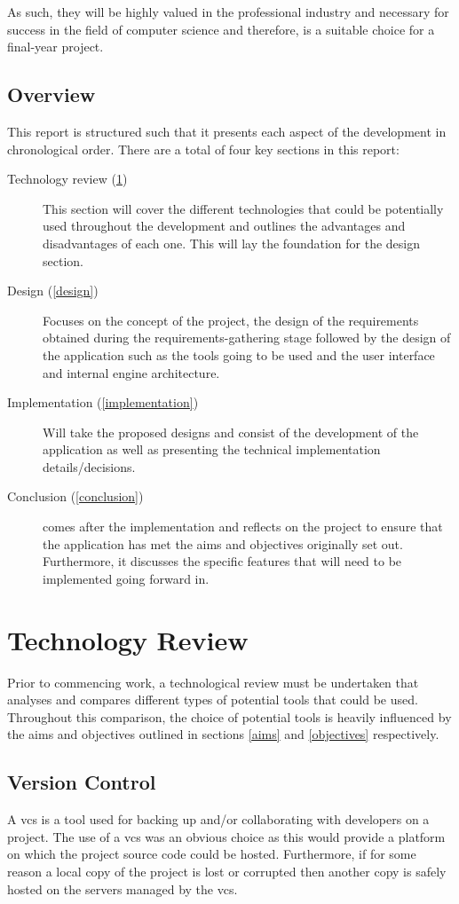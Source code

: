 \documentclass[11pt]{article}
\begin{document}
As such, they will be highly valued in the professional industry and necessary
for success in the field of computer science and therefore, is a suitable choice
for a final-year project.

\subsection{Overview}
This report is structured such that it presents each aspect of the development
in chronological order. There are a total of four key sections in this report:
\begin{description}
  \item[Technology review (\ref{technology_review})] This section will cover the
    different technologies that could be potentially used throughout the
    development and outlines the advantages and disadvantages of each one. This
    will lay the foundation for the design section.
  \item[Design (\ref{design})] Focuses on the concept of the project, the design
    of the requirements obtained during the requirements-gathering stage
    followed by the design of the application such as the tools going to be used
    and the user interface and internal engine architecture.
  \item[Implementation (\ref{implementation})] Will take the proposed designs
    and consist of the development of the application as well as presenting the
    technical implementation details/decisions.
  \item[Conclusion (\ref{conclusion})] comes after the implementation and
    reflects on the project to ensure that the application has met the aims and
    objectives originally set out. Furthermore, it discusses the specific
    features that will need to be implemented going forward in.
\end{description}

\clearpage
\section{Technology Review} \label{technology_review}
Prior to commencing work, a technological review must be undertaken that
analyses and compares different types of potential tools that could be used.
Throughout this comparison, the choice of potential tools is heavily influenced
by the aims and objectives outlined in sections \ref{aims} and \ref{objectives}
respectively.


\subsection{Version Control}
A \gls*{vcs} is a tool used for backing up and/or collaborating with developers
on a project. The use of a \gls*{vcs} was an obvious choice as this would
provide a platform on which the project source code could be hosted.
Furthermore, if for some reason a local copy of the project is lost or corrupted
then another copy is safely hosted on the servers managed by the \gls*{vcs}.
\end{document}
